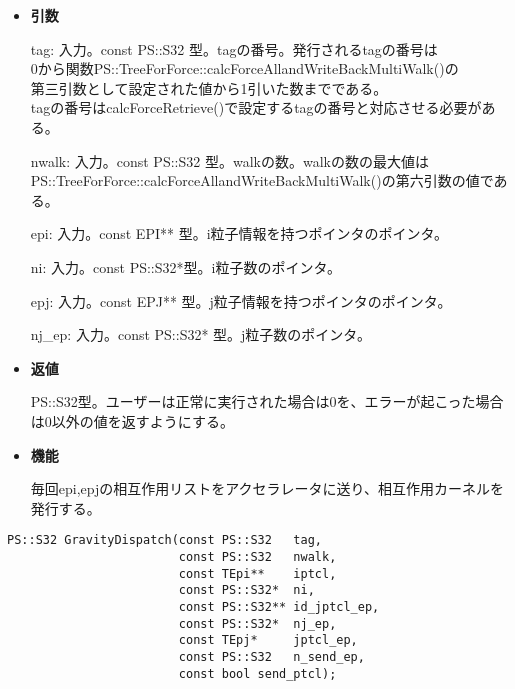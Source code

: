 \begin{itemize}

\item {\bf 引数}

  tag: 入力。const PS::S32 型。tagの番号。発行されるtagの番号は\\
  0から関数PS::TreeForForce::calcForceAllandWriteBackMultiWalk()の\\
  第三引数として設定された値から1引いた数までである。\\
  tagの番号はcalcForceRetrieve()で設定するtagの番号と対応させる必要がある。

  nwalk: 入力。const PS::S32 型。walkの数。walkの数の最大値は\\
  PS::TreeForForce::calcForceAllandWriteBackMultiWalk()の第六引数の値である。

  epi: 入力。const EPI** 型。i粒子情報を持つポインタのポインタ。

  ni: 入力。const PS::S32*型。i粒子数のポインタ。

  epj: 入力。const EPJ** 型。j粒子情報を持つポインタのポインタ。
  
  nj\_ep: 入力。const PS::S32* 型。j粒子数のポインタ。

\item {\bf 返値}

  PS::S32型。ユーザーは正常に実行された場合は0を、エラーが起こった場合
  は0以外の値を返すようにする。
  
\item {\bf 機能}

毎回epi,epjの相互作用リストをアクセラレータに送り、相互作用カーネルを
発行する。
  
\end{itemize}

\begin{lstlisting}[caption=calcForceDispatch]
PS::S32 GravityDispatch(const PS::S32   tag,
                        const PS::S32   nwalk,
                        const TEpi**    iptcl,
                        const PS::S32*  ni,
                        const PS::S32** id_jptcl_ep,
                        const PS::S32*  nj_ep,
                        const TEpj*     jptcl_ep,
                        const PS::S32   n_send_ep,
                        const bool send_ptcl);
\end{lstlisting}

